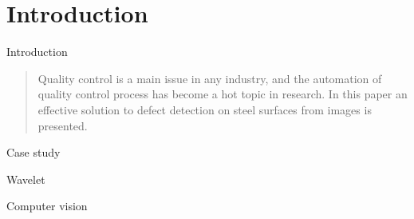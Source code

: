 \section{Introduction}
    \begin{frame}{Introduction}
        \begin{abstract}
            Quality control is a main issue in any industry, and the automation of quality control process has become a hot topic in research. In this paper an effective solution to defect detection on steel surfaces from images is presented.
        \end{abstract}
        \vskip 0.5cm
        \begin{description}
            \item<1->[1.] Case study
            \item<2->[2.] Wavelet
            \item<3->[3.] Computer vision
        \end{description}
    \end{frame}
    
    
    

